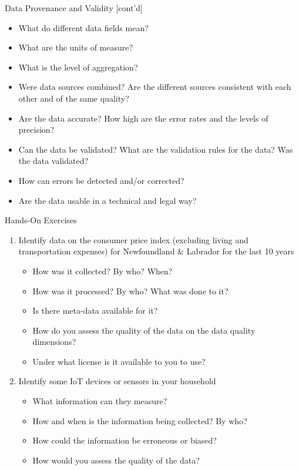 \documentclass[ignorenonframetext,xcolor=x11names]{beamer}
\begin{document}
\begin{frame}{Data Provenance and Validity \small [cont'd]}
\begin{itemize}
	\item What do different data fields mean? 
	\item What are the units of measure? 
	\item What is the level of aggregation?
	\item Were data sources combined? Are the different sources consistent with each other and of the same quality?
	\item Are the data accurate? How high are the error rates and the levels of precision?
	\item Can the data be validated? What are the validation rules for the data? Was the data validated?
	\item How can errors be detected and/or corrected?
	\item Are the data usable in a technical and legal way?
\end{itemize}
\end{frame}


\begin{frame}{Hands-On Exercises}
\begin{enumerate}
	\item Identify data on the consumer price index (excluding living and transportation expenses) for Newfoundland \& Labrador for the last 10 years
	\begin{itemize}
		\item How was it collected? By who? When?
		\item How was it processed? By who? What was done to it?
		\item Is there meta-data available for it?
		\item How do you assess the quality of the data on the data quality dimensions?
		\item Under what license is it available to you to use?
	\end{itemize}
	\item Identify some IoT devices or sensors in your household
	\begin{itemize}
		\item What information can they measure?
		\item How and when is the information being collected? By who?
		\item How could the information be erroneous or biased?
		\item How would you assess the quality of the data?
	\end{itemize}
\end{enumerate}
\end{frame}
\end{document}
